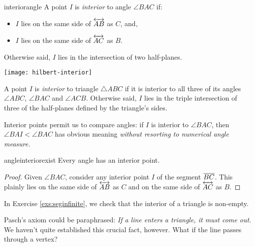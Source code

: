 \begin{defn}{}{interiorangle}
	A point $I$ is \emph{interior} to angle $\angle BAC$ if:\par
	\begin{minipage}[t]{0.6\linewidth}\vspace{0pt}
		\begin{itemize}\itemsep0pt
	  	\item $I$ lies on the same side of $\overleftrightarrow{AB}$ as $C$, and,
	  	\item $I$ lies on the same side of $\overleftrightarrow{AC}$ as $B$.
		\end{itemize}
		Otherwise said, $I$ lies in the intersection of two half-planes.
	\end{minipage}
	\hfill
	\begin{minipage}[t]{0.35\linewidth}\vspace{-20pt}
		\flushright
		\texttt{[image: hilbert-interior]}
	\end{minipage}\medbreak
	
	A point $I$ is \emph{interior} to triangle $\triangle ABC$ if it is interior to all three of its angles $\angle ABC$, $\angle BAC$ and $\angle ACB$. Otherwise said, $I$ lies in the triple intersection of three of the half-planes defined by the triangle's sides.
\end{defn}

Interior points permit us to compare angles: if $I$ is interior to $\angle BAC$, then $\angle BAI<\angle BAC$ has obvious meaning \emph{without resorting to numerical angle measure.}

\begin{cor}{}{angleinteriorexist}
	Every angle has an interior point.
\end{cor}

\begin{proof}
	Given $\angle BAC$, consider any interior point $I$ of the segment $\overline{BC}$. This plainly lies on the same side of $\overleftrightarrow{AB}$ as $C$ and on the same side of $\overleftrightarrow{AC}$ as $B$.
\end{proof}

In Exercise \ref{exs:seginfinite}, we check that the interior of a triangle is non-empty.
\vfil

\goodbreak

Pasch's axiom could be paraphrased: \emph{If a line enters a triangle, it must come out.} We haven't quite established this crucial fact, however. What if the line passes through a vertex?

\goodbreak
 
